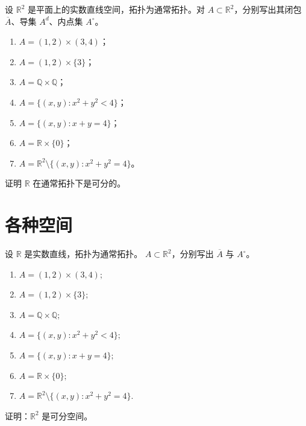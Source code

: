 \begin{homework}[7]
设 $\mathbb{R}^2$ 是平面上的实数直线空间，拓扑为通常拓扑。对 $A \subset \mathbb{R}^2$，分别写出其闭包 $\overline{A}$、导集 $A^d$、内点集 $A^\circ$。

\begin{enumerate}[(1)]
  \item $A = (1,2)\times(3,4)$；
  \item $A = (1,2)\times\{3\}$；
  \item $A = \mathbb{Q}\times\mathbb{Q}$；
  \item $A = \{(x,y): x^{2}+y^{2}<4\}$；
  \item $A = \{(x,y): x+y=4\}$；
  \item $A = \mathbb{R}\times\{0\}$；
  \item $A = \mathbb{R}^{2}\setminus\{(x,y):x^{2}+y^{2}=4\}$。
\end{enumerate}
\end{homework}

\begin{homework}[14]
证明 $\mathbb{R}$ 在通常拓扑下是可分的。
\end{homework}
\section{各种空间}

\begin{homework}[第 7 题]
设 $\mathbb{R}$ 是实数直线，拓扑为通常拓扑。  
$A \subset \mathbb{R}^2$，分别写出 $\overline{A}$ 与 $A^\circ$。

\begin{enumerate}[(1)]
  \item $A = (1,2) \times (3,4);$
  \item $A = (1,2) \times \{3\};$
  \item $A = \mathbb{Q} \times \mathbb{Q};$
  \item $A = \{(x,y): x^2 + y^2 < 4\};$
  \item $A = \{(x,y): x + y = 4\};$
  \item $A = \mathbb{R} \times \{0\};$
  \item $A = \mathbb{R}^2 \setminus \{(x,y): x^2 + y^2 = 4\}.$
\end{enumerate}
\end{homework}

\begin{homework}[第 8 题]
证明：$\mathbb{R}^2$ 是可分空间。
\end{homework}

